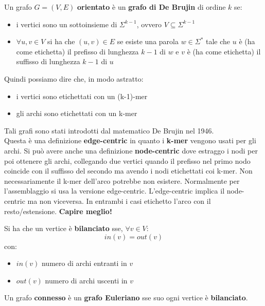 \documentclass[a4paper,12pt, oneside]{book}
\begin{document}
\begin{definizione}
  Un grafo $G=(V,E)$ \textbf{orientato} è un \textbf{grafo di De Brujin} di
  ordine $k$ se:
  \begin{itemize}
    \item i vertici sono un sottoinsieme di $\Sigma^{k-1}$, ovvero $V\subseteq
    \Sigma^{k-1}$ 
    \item $\forall u,v\in V$ si ha che $(u,v)\in E$ se esiste una parola $w\in
    \Sigma^*$ tale che $u$ è (ha come etichetta) il prefisso di lunghezza $k-1$
    di $w$ e $v$ è (ha come etichetta) il suffisso di lunghezza $k-1$ di $u$ 
  \end{itemize}
  Quindi possiamo dire che, in modo astratto:
  \begin{itemize}
    \item i vertici sono etichettati con un (k-1)-mer
    \item gli archi sono etichettati con un k-mer
  \end{itemize}
  Tali grafi sono stati introdotti dal matematico De Brujin nel 1946.\\
  Questa è una definizione \textbf{edge-centric} in quanto i \textbf{k-mer}
  vengono usati per gli archi. Si può avere anche una definizione
  \textbf{node-centric} dove estraggo i nodi per poi ottenere gli archi,
  collegando due vertici quando il prefisso nel primo nodo coincide con il
  suffisso del secondo ma avendo i nodi etichettati coi k-mer. Non
  necessariamente il k-mer dell'arco potrebbe non esistere. Normalmente per
  l'assemblaggio si usa la versione edge-centric. L'edge-centric implica il
  node-centric ma non viceversa. In entrambi i casi etichetto l'arco con il
  resto/estensione. \textbf{Capire meglio!}
\end{definizione}
\begin{definizione}
  Si ha che un vertice è \textbf{bilanciato} sse, $\forall v\in V$:
  \[in(v)=out(v)\]
  con:
  \begin{itemize}
    \item $in(v)$ numero di archi entranti in $v$
    \item $out(v)$ numero di archi uscenti in $v$
  \end{itemize}
\end{definizione}
\begin{teorema}
  Un grafo \textbf{connesso} è un \textbf{grafo Euleriano} sse suo ogni vertice
  è \textbf{bilanciato}. 
\end{teorema}
\end{document}
